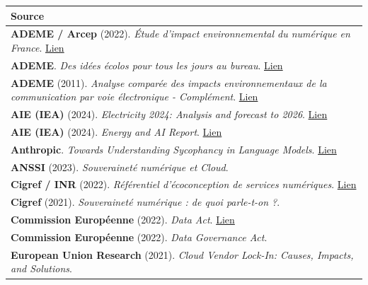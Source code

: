 \documentclass[
  10pt,
  a4paper,
  DIV=11,
  numbers=noendperiod,
  oneside]{scrreprt}
\newcounter{none} %
\let\oldtextbf\textbf
\renewcommand{\textbf}[1]{\oldtextbf{\textcolor{cmmnavy}{#1}}}
\let\oldemph\emph
\renewcommand{\emph}[1]{\oldemph{\textcolor{cmmgray}{#1}}}
\begin{document}
{\def\LTcaptype{none} %
\begin{longtable}[]{@{}
  >{\raggedright\arraybackslash}p{}@{}}
\toprule\noalign{}
\begin{minipage}[b]{\linewidth}\raggedright
Source
\end{minipage} \\
\midrule\noalign{}
\endhead
\bottomrule\noalign{}
\endlastfoot
\textbf{ADEME / Arcep} (2022). \emph{Étude d'impact environnemental du
numérique en France}.
\href{https://librairie.ademe.fr/consommer-autrement/5277-impact-environnemental-du-numerique-en-france.html}{Lien} \\
\textbf{ADEME}. \emph{Des idées écolos pour tous les jours au bureau}.
\href{https://agirpourlatransition.ademe.fr/particuliers/bureau/bons-gestes/papier-premier-dechet-bureau}{Lien} \\
\textbf{ADEME} (2011). \emph{Analyse comparée des impacts
environnementaux de la communication par voie électronique -
Complément}.
\href{https://studylibfr.com/doc/4015667/acv_ntic_synthese_resultats}{Lien} \\
\textbf{AIE (IEA)} (2024). \emph{Electricity 2024: Analysis and forecast
to 2026}. \href{https://www.iea.org/reports/electricity-2024}{Lien} \\
\textbf{AIE (IEA)} (2024). \emph{Energy and AI Report}.
\href{https://www.iea.org/reports/energy-and-ai}{Lien} \\
\textbf{Anthropic}. \emph{Towards Understanding Sycophancy in Language
Models}.
\href{https://www.anthropic.com/news/towards-understanding-sycophancy-in-language-models}{Lien} \\
\textbf{ANSSI} (2023). \emph{Souveraineté numérique et Cloud}. \\
\textbf{Cigref / INR} (2022). \emph{Référentiel d'écoconception de
services numériques}.
\href{https://eco-conception.designersethiques.org/guide/fr/}{Lien} \\
\textbf{Cigref} (2021). \emph{Souveraineté numérique : de quoi
parle-t-on ?}. \\
\textbf{Commission Européenne} (2022). \emph{Data Act}.
\href{https://digital-strategy.ec.europa.eu/en/policies/data-act}{Lien} \\
\textbf{Commission Européenne} (2022). \emph{Data Governance Act}. \\
\textbf{European Union Research} (2021). \emph{Cloud Vendor Lock-In:
Causes, Impacts, and Solutions}. \\

\end{longtable}}
\end{document}

